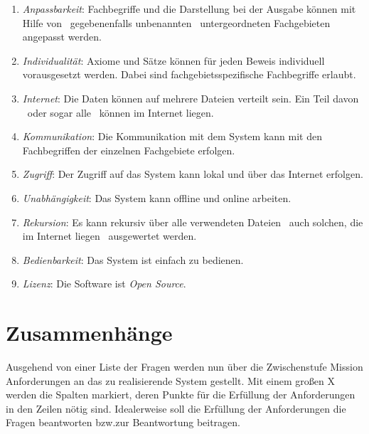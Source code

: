 \documentclass[english,ngerman,parskip=half,headsepline,footsepline]{scrreprt}
\begin{document}
\begin{enumerate}
		\item \label{Ziel:Anpassbarkeit} \emph{Anpassbarkeit}: Fachbegriffe und die Darstellung bei der Ausgabe können mit Hilfe von \textendash\ gegebenenfalls unbenannten \textendash\ untergeordneten Fachgebieten angepasst werden.

		\item \label{Ziel:Individualität} \emph{Individualität}: Axiome und Sätze können für jeden Beweis individuell vorausgesetzt werden. Dabei sind fachgebietsspezifische Fachbegriffe erlaubt.

		\item \label{Ziel:Internet} \emph{Internet}: Die Daten können auf mehrere Dateien verteilt sein. Ein Teil davon \textendash\ oder sogar alle \textendash\ können im Internet liegen.

		\item \label{Ziel:Kommunikation} \emph{Kommunikation}: Die Kommunikation mit dem System kann mit den Fachbegriffen der einzelnen Fachgebiete erfolgen.

		\item \label{Ziel:Zugriff} \emph{Zugriff}: Der Zugriff auf das System kann lokal und über das Internet erfolgen.

		\item \label{Ziel:Unabhängigkeit} \emph{Unabhängigkeit}: Das System kann offline und online arbeiten.

		\item \label{Ziel:Rekursion} \emph{Rekursion}: Es kann rekursiv über alle verwendeten Dateien \textendash\ auch solchen, die im Internet liegen \textendash\ ausgewertet werden.

		\item \label{Ziel:Bedienbarkeit} \emph{Bedienbarkeit}: Das System ist einfach zu bedienen.

		\item \label{Ziel:Lizenz} \emph{Lizenz}: Die Software ist \emph{Open Source}.

	\end{enumerate}

	\section{Zusammenhänge} %
    \label{sec:Zusammenhänge}

	Ausgehend von einer Liste der Fragen werden nun über die Zwischenstufe Mission Anforderungen an das zu realisierende System gestellt. Mit einem großen X werden die Spalten markiert, deren Punkte für die Erfüllung der Anforderungen in den Zeilen nötig sind. Idealerweise soll die Erfüllung der Anforderungen die Fragen beantworten bzw.\@ zur Beantwortung beitragen.
\end{document}

